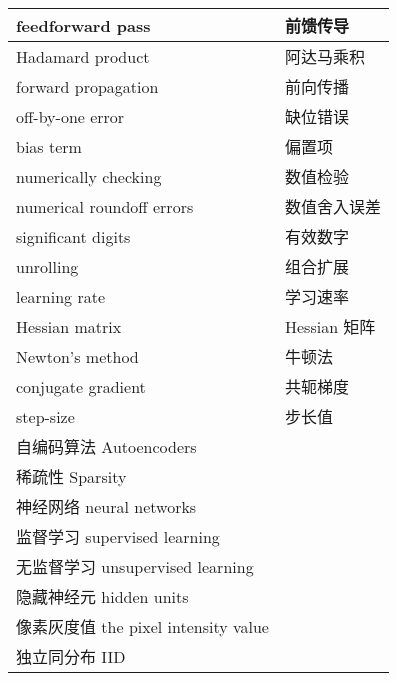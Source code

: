 \begin{longtable}[h]{m{}m{}}
feedforward pass & 前馈传导 \\
  \midrule

Hadamard product & 阿达马乘积 \\
  \midrule

forward propagation & 前向传播 \\
  \midrule

off-by-one error & 缺位错误 \\
  \midrule

bias term & 偏置项 \\
  \midrule

numerically checking & 数值检验 \\
  \midrule

numerical roundoff errors & 数值舍入误差 \\
  \midrule

significant digits & 有效数字 \\
  \midrule

unrolling & 组合扩展 \\
  \midrule

learning rate & 学习速率 \\
  \midrule

Hessian matrix & Hessian 矩阵 \\
  \midrule

Newton's method & 牛顿法 \\
  \midrule

conjugate gradient & 共轭梯度 \\
  \midrule

step-size & 步长值 \\
  \midrule

自编码算法 Autoencoders \\
  \midrule

稀疏性 Sparsity \\
  \midrule

神经网络 neural networks \\
  \midrule

监督学习 supervised learning \\
  \midrule

无监督学习 unsupervised learning \\
  \midrule

隐藏神经元 hidden units \\
  \midrule

像素灰度值 the pixel intensity value \\
  \midrule

独立同分布 IID \\
  \midrule


\end{longtable}
